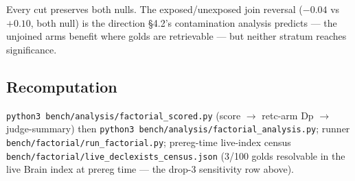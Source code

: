 \documentclass[10pt]{article}
\newcommand{\code}[1]{\texttt{#1}}
\begin{document}
Every cut preserves both nulls. The exposed/unexposed join reversal
($-0.04$ vs $+0.10$, both null) is the direction \S 4.2's
contamination analysis predicts --- the unjoined arms benefit where
golds are retrievable --- but neither stratum reaches significance.

\subsection{Recomputation}

\code{python3 bench/analysis/factorial\_scored.py} (score $\to$
retc-arm Dp $\to$ judge-summary) then
\code{python3 bench/analysis/factorial\_analysis.py}; runner
\code{bench/factorial/run\_factorial.py}; prereg-time live-index
census \code{bench/factorial/live\_declexists\_census.json} (3/100
golds resolvable in the live Brain index at prereg time --- the drop-3
sensitivity row above).
\end{document}

